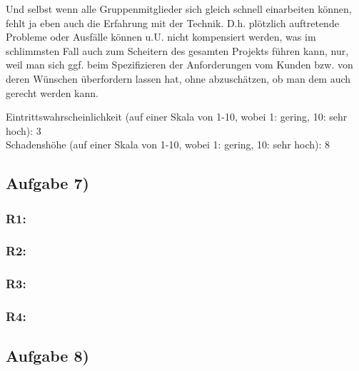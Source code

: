 \documentclass{swp1}
\begin{document}
Und selbst wenn alle Gruppenmitglieder sich gleich schnell einarbeiten können, fehlt ja eben auch die Erfahrung mit der Technik. D.h. plötzlich auftretende Probleme oder Ausfälle können u.U. nicht kompensiert werden, was im schlimmsten Fall auch zum Scheitern des gesamten Projekts führen kann, nur, weil man sich ggf. beim Spezifizieren der Anforderungen vom Kunden bzw. von deren Wünschen überfordern lassen hat, ohne abzuschätzen, ob man dem auch gerecht werden kann.

Eintrittswahrscheinlichkeit (auf einer Skala von 1-10, wobei 1: gering, 10: sehr hoch): 3 \\
Schadenshöhe (auf einer Skala von 1-10, wobei 1: gering, 10: sehr hoch): 8

\subsection*{Aufgabe 7)}
\subsubsection*{R1:}

\subsubsection*{R2:}
\subsubsection*{R3:}
\subsubsection*{R4:}

\subsection*{Aufgabe 8)}
     
\end{document}
